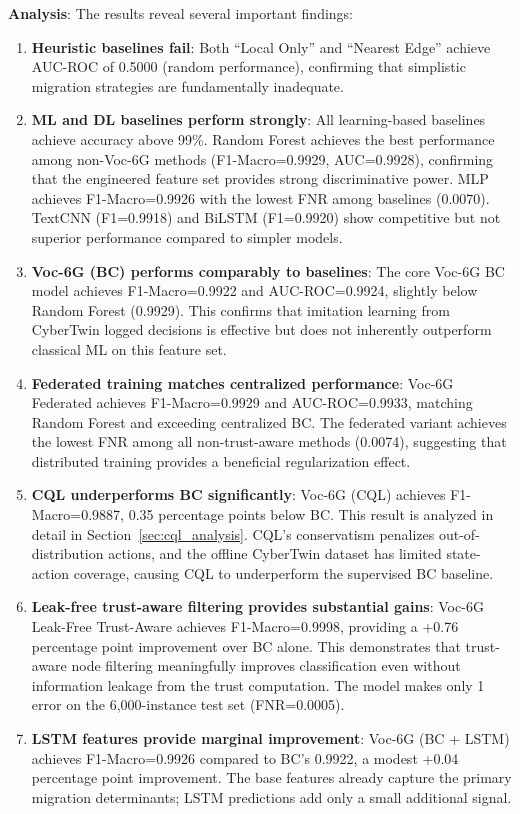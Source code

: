 \documentclass[journal,twoside]{IEEEtran}
\newcommand{\VocSixG}{Voc-6G}
\begin{document}
\textbf{Analysis}: The results reveal several important findings:

\begin{enumerate}
    \item \textbf{Heuristic baselines fail}: Both ``Local Only'' and ``Nearest Edge'' achieve AUC-ROC of 0.5000 (random performance), confirming that simplistic migration strategies are fundamentally inadequate.

    \item \textbf{ML and DL baselines perform strongly}: All learning-based baselines achieve accuracy above 99\%. Random Forest achieves the best performance among non-\VocSixG{} methods (F1-Macro=0.9929, AUC=0.9928), confirming that the engineered feature set provides strong discriminative power. MLP achieves F1-Macro=0.9926 with the lowest FNR among baselines (0.0070). TextCNN (F1=0.9918) and BiLSTM (F1=0.9920) show competitive but not superior performance compared to simpler models.

    \item \textbf{Voc-6G (BC) performs comparably to baselines}: The core \VocSixG{} BC model achieves F1-Macro=0.9922 and AUC-ROC=0.9924, slightly below Random Forest (0.9929). This confirms that imitation learning from CyberTwin logged decisions is effective but does not inherently outperform classical ML on this feature set.

    \item \textbf{Federated training matches centralized performance}: \VocSixG{} Federated achieves F1-Macro=0.9929 and AUC-ROC=0.9933, matching Random Forest and exceeding centralized BC. The federated variant achieves the lowest FNR among all non-trust-aware methods (0.0074), suggesting that distributed training provides a beneficial regularization effect.

    \item \textbf{CQL underperforms BC significantly}: \VocSixG{} (CQL) achieves F1-Macro=0.9887, 0.35 percentage points below BC. This result is analyzed in detail in Section~\ref{sec:cql_analysis}. CQL's conservatism penalizes out-of-distribution actions, and the offline CyberTwin dataset has limited state-action coverage, causing CQL to underperform the supervised BC baseline.

    \item \textbf{Leak-free trust-aware filtering provides substantial gains}: \VocSixG{} Leak-Free Trust-Aware achieves F1-Macro=0.9998, providing a +0.76 percentage point improvement over BC alone. This demonstrates that trust-aware node filtering meaningfully improves classification even without information leakage from the trust computation. The model makes only 1 error on the 6,000-instance test set (FNR=0.0005).

    \item \textbf{LSTM features provide marginal improvement}: \VocSixG{} (BC + LSTM) achieves F1-Macro=0.9926 compared to BC's 0.9922, a modest +0.04 percentage point improvement. The base features already capture the primary migration determinants; LSTM predictions add only a small additional signal.
\end{enumerate}
\end{document}

